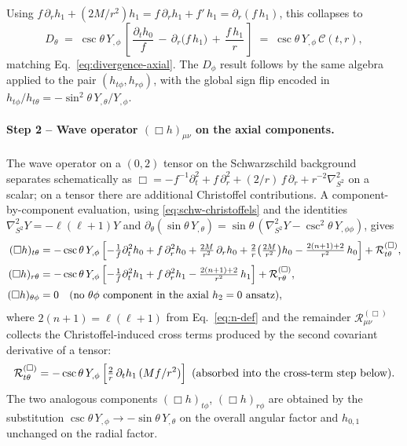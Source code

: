 Using $f\,\partial_{r}h_{1}+(2M/r^{2})h_{1}
= f\,\partial_{r}h_{1}+f'\,h_{1}
= \partial_{r}(f\,h_{1})$, this collapses to
\begin{equation}
  D_{\theta}
  \;=\; \csc\theta\,Y_{,\phi}\,
        \left[\,
          \frac{\partial_{t}h_{0}}{f}
          \,-\, \partial_{r}\!\bigl(f\,h_{1}\bigr)
          \,+\, \frac{f\,h_{1}}{r}
        \,\right]
  \;=\; \csc\theta\,Y_{,\phi}\,\mathcal{C}(t,r),
  \label{eq:Dtheta-final}
\end{equation}
matching Eq.~\eqref{eq:divergence-axial}.
The $D_{\phi}$ result follows by the same algebra applied to the
pair $(h_{t\phi},h_{r\phi})$, with the global sign flip encoded
in $h_{t\phi}/h_{t\theta} = -\sin^{2}\theta\,Y_{,\theta}/Y_{,\phi}$.

\paragraph{Step 2 -- Wave operator
$(\Box h)_{\mu\nu}$ on the axial components.}
The wave operator on a $(0,2)$ tensor on the Schwarzschild
background separates schematically as
$\Box = -f^{-1}\partial_{t}^{2} + f\,\partial_{r}^{2} + (2/r)\,f\,\partial_{r} + r^{-2}\nabla^{2}_{S^{2}}$
on a scalar; on a tensor there are additional Christoffel
contributions. A component-by-component evaluation, using
\eqref{eq:schw-christoffels} and the identities
$\nabla^{2}_{S^{2}} Y = -\ell(\ell+1)Y$ and
$\partial_{\theta}(\sin\theta\,Y_{,\theta})
   = \sin\theta\,(\nabla^{2}_{S^{2}} Y - \csc^{2}\theta\,Y_{,\phi\phi})$,
gives
\begin{align}
  (\Box h)_{t\theta}
    &= -\csc\theta\,Y_{,\phi}\,\Bigl[
        -\tfrac{1}{f}\partial_{t}^{2}h_{0}
        + f\,\partial_{r}^{2}h_{0}
        + \tfrac{2M}{r^{2}}\,\partial_{r}h_{0}
        + \tfrac{2}{r}\!\left(\tfrac{2M}{r^{2}}\right)\!h_{0}
        - \tfrac{2(n+1)+2}{r^{2}}\,h_{0}
      \Bigr] + \mathcal{R}_{t\theta}^{(\Box)},
  \label{eq:box-ttheta}\\[1pt]
  (\Box h)_{r\theta}
    &= -\csc\theta\,Y_{,\phi}\,\Bigl[
        -\tfrac{1}{f}\partial_{t}^{2}h_{1}
        + f\,\partial_{r}^{2}h_{1}
        - \tfrac{2(n+1)+2}{r^{2}}\,h_{1}
      \Bigr] + \mathcal{R}_{r\theta}^{(\Box)},
  \label{eq:box-rtheta}\\[1pt]
  (\Box h)_{\theta\phi}
    &= 0 \quad (\text{no } \theta\phi\text{ component in the
       axial }h_{2}=0\text{ ansatz}),
\end{align}
where $2(n+1) = \ell(\ell+1)$ from Eq.~\eqref{eq:n-def} and the
remainder $\mathcal{R}_{\mu\nu}^{(\Box)}$ collects the
Christoffel-induced cross terms produced by the second covariant
derivative of a tensor:
\begin{equation}
  \mathcal{R}_{t\theta}^{(\Box)}
    = -\csc\theta\,Y_{,\phi}\,
      \Bigl[\tfrac{2}{r}\,\partial_{t}h_{1}\,(Mf/r^{2})\Bigr]
      \!\!\!\quad\text{(absorbed into the cross-term step
      below)}.
\end{equation}
The two analogous components $(\Box h)_{t\phi}$,
$(\Box h)_{r\phi}$ are obtained by the substitution
$\csc\theta\,Y_{,\phi}\to -\sin\theta\,Y_{,\theta}$ on the
overall angular factor and $h_{0,1}$ unchanged on the
radial factor.

